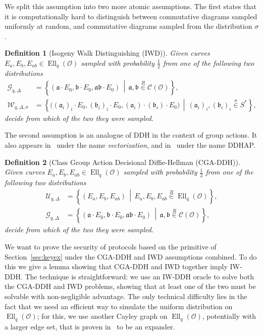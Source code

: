 \documentclass{article}
\newcommand{\Cl}{\mathcal{C}}
\renewcommand{\O}{\mathcal{O}}
\newcommand{\suchthat}{\,\middle\vert\,}
\renewcommand{\frak}{\mathfrak}
\newcommand{\rand}[1]{\overset{#1}{∈}}
\newcommand{\uni}{\rand{R}}
\newtheorem{definition}{Definition}[section]
\theoremstyle{definition}
\DeclareMathOperator{\Ell}{Ell}
\begin{document}
We split this assumption into two more atomic assumptions. The first
states that it is computationally hard to distinguish between
commutative diagrams sampled uniformly at random, and commutative
diagrams sampled from the distribution $σ$.

\begin{definition}[Isogeny Walk Distinguishing (IWD)]
  Given curves $E_a,E_b,E_{ab}∈\Ell_q(\O)$ sampled with probability
  $\frac{1}{2}$ from one of the following two distributions
  \begin{align*}
    \mathcal{G}_{q,Δ} &= \left\{(\frak a·E_0,\frak b·E_0,\frak{ab}·E_0) \suchthat
                        \frak a,\frak b\uni\Cl(\O)\right\},\\
    \mathcal{W}_{q,Δ,σ} &= \left\{\bigl((\frak a_i)_i·E_0,(\frak b_i)_i·E_0,(\frak a_i)·(\frak b_i)·E_0\bigr) \suchthat
                          (\frak a_i)_i,(\frak b_i)_i\rand{σ}S^*\right\},
  \end{align*}
  decide from which of the two they were sampled.
\end{definition}

The second assumption is an analogue of DDH in the context of group
actions. It also appears in~\cite{cryptoeprint:2006:291} under the
name \emph{vectorization}, and in~\cite{Stol,Stolbunov2012} under the
name DDHAP.
 
\begin{definition}[Class Group Action Decisional Diffie-Hellman (CGA-DDH)]
  Given curves $E_a,E_b,E_{ab}∈\Ell_q(\O)$ sampled with probability
  $\frac{1}{2}$ from one of the following two distributions
  \begin{align*}
    \mathcal{U}_{q,Δ} &= \left\{(E_a,E_b,E_{ab}) \suchthat E_a,E_b,E_{ab}\uni\Ell_q(\O)\right\},\\
    \mathcal{G}_{q,Δ} &= \left\{(\frak a·E_0,\frak b·E_0,\frak{ab}·E_0) \suchthat
                        \frak a,\frak b\uni\Cl(\O)\right\},
  \end{align*}
  decide from which of the two they were sampled.
\end{definition}

We want to prove the security of protocols based on the primitive of
Section~\ref{sec:keyex} under the CGA-DDH and IWD assumptions
combined. To do this we give a lemma showing that CGA-DDH and IWD
together imply IW-DDH. The technique is straightforward: we use an
IW-DDH oracle to solve both the CGA-DDH and IWD problems, showing that
at least one of the two must be solvable with non-negligible
advantage. The only technical difficulty lies in the fact that we need
an efficient way to simulate the uniform distribution on $\Ell_q(\O)$;
for this, we use another Cayley graph on $\Ell_q(\O)$, potentially
with a larger edge set, that is proven
in~\cite{jao+miller+venkatesan09} to be an expander.
\end{document}

